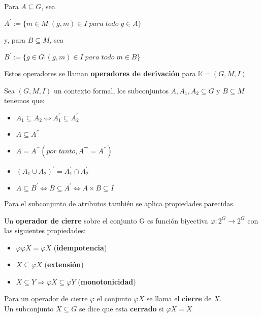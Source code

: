\documentclass[../../main.tex]{subfiles}
\begin{document}
\begin{definicion}
Para $A \subseteq G$, sea
\begin{center}
    $A^{'} := { \{m \in M | (g, m) \in I\;para\;todo\;g \in A\} }$
\end{center}
y, para $B \subseteq M$, sea
\begin{center}
    $B^{'} := { \{g \in G | (g, m) \in I\;para\;todo\;m \in B\} }$
\end{center}
\end{definicion}
Estos operadores se llaman \textbf{operadores de derivación} para $\mathbb{K} = (G, M, I)$


\begin{definicion}
Sea $(G, M, I)$ un contexto formal, los subconjuntos $A, A_1, A_2 \subseteq G$ y $B \subseteq M$ tenemos que:
\begin{itemize}
    \item $A_1 \subseteq A_2 \Longleftrightarrow A_1^{'} \subseteq A_2^{'}$
    \item $A \subseteq A^{''}$
    \item $A = A^{'''} (por\;tanto, A^{''''} = A^{''})$
    \item $(A_1 \cup A_2)^{'} = A_1^{'} \cap A_2^{'}$
    \item $A \subseteq B^{'} \Longleftrightarrow B \subseteq A^{'} \Longleftrightarrow A \times B \subseteq I$
\end{itemize}
\end{definicion}

Para el subconjunto de atributos también se aplica propiedades parecidas.


\begin{definicion}
Un \textbf{operador de cierre} sobre el conjunto G es función biyectiva $\varphi : 2^{G} \longrightarrow 2^{G}$ con las siguientes propiedades:
\begin{itemize}
    \item $\varphi \varphi X = \varphi X$ (\textbf{idempotencia})
    \item $X \subseteq \varphi X$ (\textbf{extensión})
    \item $X \subseteq Y \Longrightarrow \varphi X \subseteq \varphi Y$ (\textbf{monotonicidad})
\end{itemize}
\begin{center}
    Para un operador de cierre $\varphi$ el conjunto $\varphi X$ se llama el \textbf{cierre} de $X$. \\
    Un subconjunto $X \subseteq G$ se dice que esta \textbf{cerrado} si $\varphi X = X$
\end{center}
\end{definicion}
\end{document}
